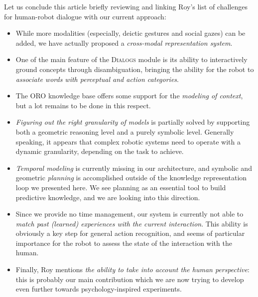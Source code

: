 \documentclass{svmult}
\begin{document}
Let us conclude this article briefly reviewing and linking Roy's list of challenges
for human-robot dialogue with our current approach: 
\begin{itemize}

	\item While more modalities (especially, deictic gestures and social gazes)
	can be added, we have actually proposed a \emph{cross-modal
	representation system}.

	\item One of the main feature of the \textsc{Dialogs} module is its ability
	to interactively ground concepts through disambiguation, bringing the
	ability for the robot to \emph{associate words with perceptual and action
	categories}.

	\item The ORO knowledge base offers some support for the \emph{modeling of
	context}, but a lot remains to be done in this respect.

	\item \emph{Figuring out the right granularity of models} is partially
	solved by supporting both a geometric reasoning level and a purely symbolic
	level. Generally speaking, it appears that complex robotic systems need
	to operate with a dynamic granularity, depending on the task to achieve.

	\item \emph{Temporal modeling} is currently missing in our architecture,
	and symbolic and geometric \emph{planning} is accomplished outside of the
	knowledge representation loop we presented here. We see planning as an
	essential tool to build predictive knowledge, and we are looking into this
	direction.

	\item Since we provide no time management, our system is currently not able
	to \emph{match past (learned) experiences with the current interaction}.
	This ability is obviously a key step for general action recognition, and
	seems of particular importance for the robot to assess the state of the
	interaction with the human.

	\item Finally, Roy mentions \emph{the ability to take into account the
	human perspective}: this is probably our main contribution which we are now
	trying to develop even further towards psychology-inspired experiments.

\end{itemize}









\end{document}
